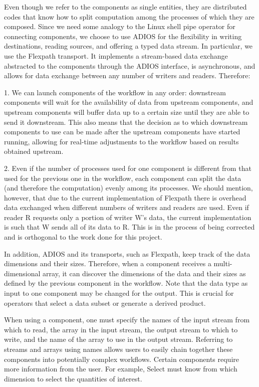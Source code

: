 \documentclass[conference]{IEEEtran}
\begin{document}
Even though we refer to the components as single entities, they are distributed
codes that know how to split computation among the processes of which they are
composed. Since we need some analogy to the Linux shell pipe operator for
connecting components, we choose to use ADIOS for the flexibility in writing
destinations, reading sources, and offering a typed data stream. In particular,
we use the Flexpath transport. It implements a stream-based data exchange
abstracted to the components through the ADIOS interface, is asynchronous, and
allows for data exchange between any number of writers and readers. Therefore:

1. We can launch components of the workflow in any order: downstream components
will wait for the availability of data from upstream components, and upstream
components will buffer data up to a certain size until they are able to send it
downstream. This also means that the decision as to which downstream
components to use can be made after the upstream components have started
running, allowing for real-time adjustments to the workflow based on results
obtained upstream.

2. Even if the number of processes used for one component is different from that
used for the previous one in the workflow, each component can split the data
(and therefore the computation) evenly among its processes. We should mention,
however, that due to the current implementation of Flexpath there is overhead
data exchanged when different numbers of writers and readers are used. Even if
reader R requests only a portion of writer W’s data, the current implementation
is such that W sends all of its data to R. This is in the process of being
corrected and is orthogonal to the work done for this project.

In addition, ADIOS and its transports, such as Flexpath, keep track of the
data dimensions and their sizes. Therefore, when a component receives a
multi-dimensional array, it can discover the dimensions of the data and their
sizes as defined by the previous component in the workflow. Note that the
data type as input to one component may be changed for the output. This is
crucial for operators that select a data subset or generate a derived product.

When using a component, one must specify the names of the input stream from
which to read, the array in the input stream, the output stream to which to
write, and the name of the array to use in the output stream. Referring to
streams and arrays using names allows users to easily chain together these
components into potentially complex workflows. Certain components require more
information from the user. For example, Select must know from which dimension
to select the quantities of interest.
\end{document}
